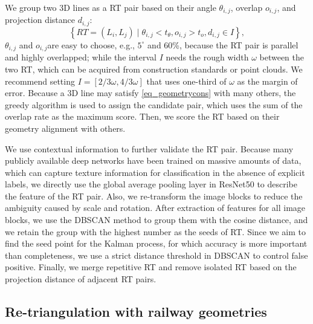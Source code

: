 We group two 3D lines as a RT pair based on their angle $\theta_{i,j}$,
overlap $o_{i,j}$,
and projection distance $d_{i,j}$:
\begin{equation}
   \left\{ RT= \left(L_i, L_j\right) \mid \theta_{i,j} < t_\theta, o_{i,j} > t_o, d_{i,j} \in I  \right\},
    \label{eq_geometrycons}
\end{equation}
$\theta_{i,j}$ and $o_{i,j}$are easy to choose,
e.g.,
$5^\circ$ and 60\%,
because the RT pair is parallel and highly overlapped;
while the interval $I$ needs the rough width $\omega$ between the two RT,
which can be acquired from construction standards or point clouds.
We recommend setting $I=\left[2/3\omega,4/3\omega\right]$ that uses one-third of $\omega$ as the margin of error.
Because a 3D line may satisfy \cref{eq_geometrycons} with many others,
the greedy algorithm is used to assign the candidate pair,
which uses the sum of the overlap rate as the maximum score.
Then,
we score the RT based on their geometry alignment with others.

We use contextual information to further validate the RT pair.
Because many publicly available deep networks have been trained on massive amounts of data,
which can capture texture information for classification in the absence of explicit labels,
we directly use the global average pooling layer in ResNet50 to describe the feature of the RT pair.
Also,
we re-transform the image blocks to reduce the ambiguity caused by scale and rotation.
After extraction of features for all image blocks, 
we use the DBSCAN method to group them with the cosine distance,
and we retain the group with the highest number as the seeds of RT.
Since we aim to find the seed point for the Kalman process,
for which accuracy is more important than completeness,
we use a strict distance threshold in DBSCAN to control false positive. 
Finally,
we merge repetitive RT and remove isolated RT based on the projection distance of adjacent RT pairs.
\subsection{Re-triangulation with railway geometries}












